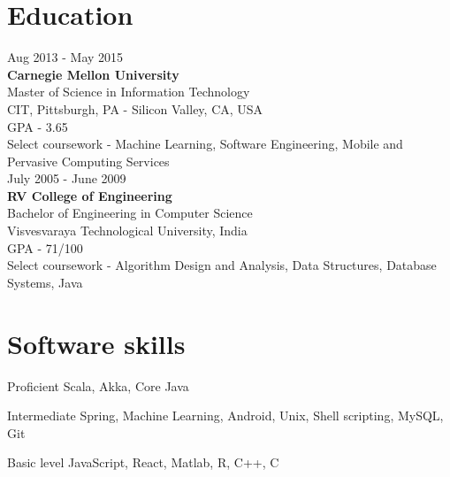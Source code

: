 \documentclass{tccv}
\begin{document}
\section{Education}

{\hfill\sc Aug 2013 - May 2015}\\
\textbf{Carnegie Mellon University}\\ 
Master of Science in Information Technology\\
CIT, Pittsburgh, PA - Silicon Valley, CA, USA\\
GPA - 3.65\\
Select coursework - Machine Learning, Software Engineering, Mobile and Pervasive Computing Services\\

{\hfill\sc July 2005 - June 2009}\\
\textbf{RV College of Engineering}\\
Bachelor of Engineering in Computer Science\\
Visvesvaraya Technological University, India\\
GPA - 71/100\\
Select coursework - Algorithm Design and Analysis, Data Structures, Database Systems, Java\\ 


\vspace{-0.2in}
\section{Software skills}
\begin{factlist}
\item{Proficient}
     {Scala, Akka, Core Java}

\item{Intermediate}
     {Spring, Machine Learning, Android, Unix, Shell scripting, MySQL, Git}

\item{Basic level}
     {JavaScript, React, Matlab, R, C++, C}
\end{factlist}
\end{document}
